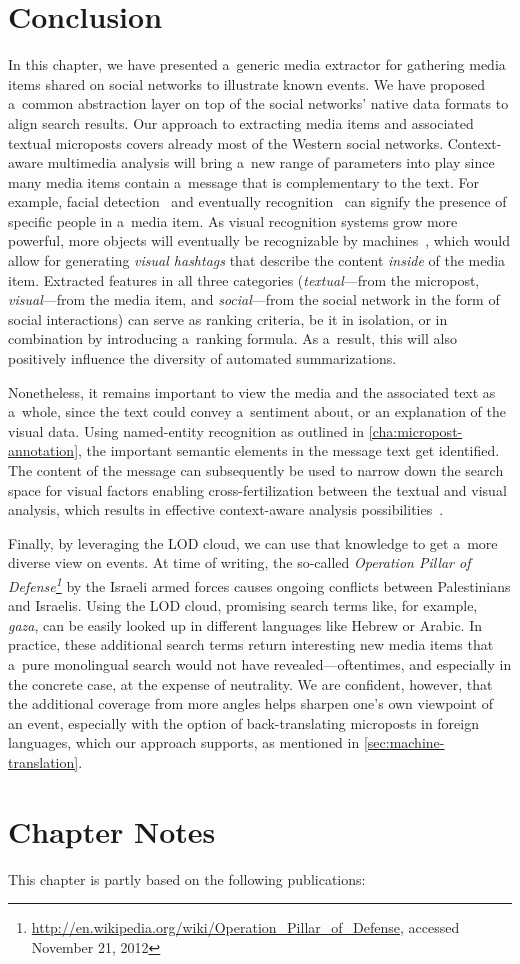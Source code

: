 \section{Conclusion}
\label{sec:conclusion}

In this chapter, we have presented a~generic media extractor
for gathering media items shared on social networks to
illustrate known events.
We have proposed a~common abstraction layer on top of the
social networks' native data formats to align search results.
Our approach to extracting media items and associated
textual microposts covers already most of
the Western social networks.
Context-aware multimedia analysis will bring a~new range of
parameters into play since many media items contain a~message
that is complementary to the text.
For example, facial detection~\cite{viola2004facedetection}
and eventually recognition~\cite{wright2009facerecognition}
can signify the presence of specific people in a~media item.
As visual recognition systems grow more powerful,
more objects will eventually be recognizable by
machines~\cite{serre2007objectrecognition},
which would allow for generating \emph{visual hashtags}
that describe the content
\emph{inside} of the media item.
Extracted features in all three categories
(\emph{textual}---from the micropost,
\emph{visual}---from the media item,
and \emph{social}---from the social network
in the form of social interactions)
can serve as ranking criteria, be it in isolation,
or in combination by introducing a~ranking formula.
As a~result, this will also positively influence
the diversity of automated summarizations.

Nonetheless, it remains important to view the media and the
associated text as a~whole, since the text
could convey a~sentiment about,
or an explanation of the visual data.
Using named-entity recognition as outlined in
\autoref{cha:micropost-annotation},
the important semantic elements in the message text get identified. 
The content of the message can subsequently be used
to narrow down the search space for visual factors
enabling cross-fertilization between the textual
and visual analysis, which results in effective context-aware analysis possibilities~\cite{verborgh2012multimediaannotation}.

Finally, by leveraging the LOD cloud,
we can use that knowledge to get a~more diverse view on events.
At time of writing, the so-called
\emph{Operation Pillar of
Defense\footnote{\url{http://en.wikipedia.org/wiki/Operation_Pillar_of_Defense}, accessed November 21, 2012}}
by the Israeli armed forces
causes ongoing conflicts between Palestinians and Israelis.
Using the LOD cloud, promising search terms like, for example,
\emph{gaza}, can be easily looked up in different languages
like Hebrew or Arabic.
In practice, these additional search terms return interesting
new media items that a~pure monolingual search
would not have revealed---oftentimes,
and especially in the concrete case,
at the expense of neutrality.
We are confident, however, that the additional coverage
from more angles helps sharpen one's own viewpoint of an event,
especially with the option of back-translating microposts
in foreign languages, which our approach supports,
as mentioned in \autoref{sec:machine-translation}.

\section*{Chapter Notes}
This chapter is partly based on the following publications:
